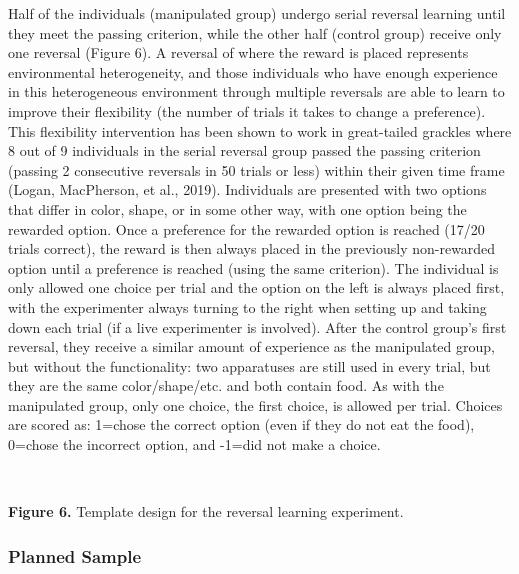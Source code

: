 \documentclass[
]{article}
\begin{document}
Half of the individuals (manipulated group) undergo serial reversal
learning until they meet the passing criterion, while the other half
(control group) receive only one reversal (Figure 6). A reversal of
where the reward is placed represents environmental heterogeneity, and
those individuals who have enough experience in this heterogeneous
environment through multiple reversals are able to learn to improve
their flexibility (the number of trials it takes to change a
preference). This flexibility intervention has been shown to work in
great-tailed grackles where 8 out of 9 individuals in the serial
reversal group passed the passing criterion (passing 2 consecutive
reversals in 50 trials or less) within their given time frame (Logan,
MacPherson, et al., 2019). Individuals are presented with two options
that differ in color, shape, or in some other way, with one option being
the rewarded option. Once a preference for the rewarded option is
reached (17/20 trials correct), the reward is then always placed in the
previously non-rewarded option until a preference is reached (using the
same criterion). The individual is only allowed one choice per trial and
the option on the left is always placed first, with the experimenter
always turning to the right when setting up and taking down each trial
(if a live experimenter is involved). After the control group's first
reversal, they receive a similar amount of experience as the manipulated
group, but without the functionality: two apparatuses are still used in
every trial, but they are the same color/shape/etc. and both contain
food. As with the manipulated group, only one choice, the first choice,
is allowed per trial. Choices are scored as: 1=chose the correct option
(even if they do not eat the food), 0=chose the incorrect option, and
-1=did not make a choice.

~

\textbf{Figure 6.} Template design for the reversal learning experiment.

\hypertarget{planned-sample}{%
\subsubsection{Planned Sample}\label{planned-sample}}
\end{document}
